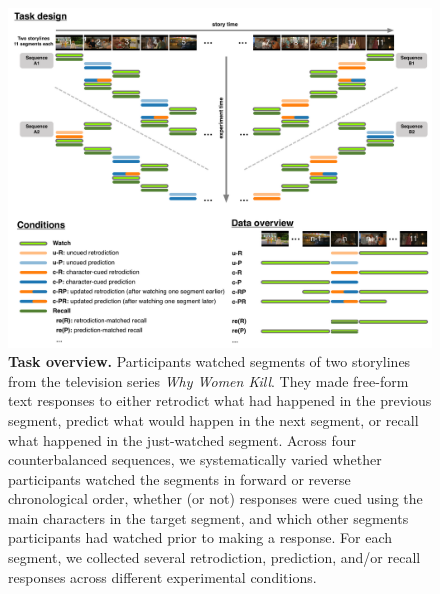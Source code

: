 \documentclass[10pt]{article}
\begin{document}
\begin{figure}[tp]
  \centering
  \includegraphics[width=\textwidth]{methods}
  \caption{\textbf{Task overview.} Participants watched segments of two storylines from the television series \textit{Why Women Kill}.  They made free-form text responses to either retrodict what had happened in the previous segment, predict what would happen in the next segment, or recall what happened in the just-watched segment. Across four counterbalanced sequences, we systematically varied whether participants watched the segments in forward or reverse chronological order, whether (or not) responses were cued using the main characters in the target segment, and which other segments participants had watched prior to making a response.  For each segment, we collected several retrodiction, prediction, and/or recall responses across different experimental conditions.}
  \label{fig:method}
\end{figure}
\end{document}
